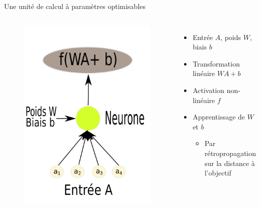 \documentclass{beamer}
\begin{document}
\begin{frame}{Une unité de calcul à paramètres optimisables}

  \begin{columns}
    \begin{figure}
      \centering
      \includegraphics[scale=0.17]{../Figures/Neuron}
    \end{figure}

    \begin{itemize}
    \item Entrée $A$, poids $W$, biais $b$
    \item Transformation linéaire $WA + b$
    \item Activation non-linéaire $f$
    \item Apprentissage de $W$ et $b$
      \begin{itemize}
      \item Par rétropropagation sur la distance à l'objectif
      \end{itemize}
    \end{itemize}
  \end{columns}

\end{frame}
\end{document}
